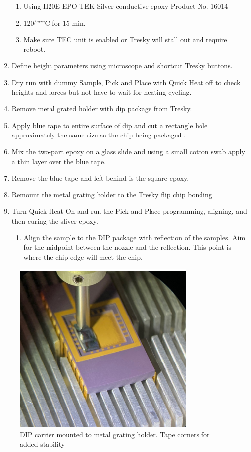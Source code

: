 \begin{enumerate}
    \begin{enumerate}
        \item Using H20E EPO-TEK Silver conductive epoxy Product No. 16014
        \item 120$^{/circ}$C for 15 min.
        \item Make sure TEC unit is enabled or Tresky will stall out and require reboot.
    \end{enumerate}
    \item Define height parameters using microscope and shortcut Tresky buttons.
    \item Dry run with dummy Sample, Pick and Place with Quick Heat off to check heights and forces but not have to wait for heating cycling.
    \item Remove metal grated holder with dip package from Tresky.
    \item Apply blue tape to entire surface of dip and cut a rectangle hole approximately the same size as the chip being packaged .
    \item Mix the two-part epoxy on a glass slide and using a small cotton swab apply a thin layer over the blue tape.
    \item Remove the blue tape and left behind is the square epoxy.
    \item Remount the metal grating holder to the Tresky flip chip bonding
    \item Turn Quick Heat On and run the Pick and Place programming, aligning, and then curing the sliver epoxy.
    \begin{enumerate}
        \item Align the sample to the DIP package with reflection of the samples. Aim for the midpoint between the nozzle and the reflection. This point is where the chip edge will meet the chip.
    \end{enumerate}
\end{enumerate}


\begin{figure}[!ht]
\centering
\includegraphics[width=3.5in]{./Figures/AppendixA/FigAppA10}
\caption{DIP carrier mounted to metal grating holder. Tape corners for added stability}
\label{FigAppA10}
\end{figure}

